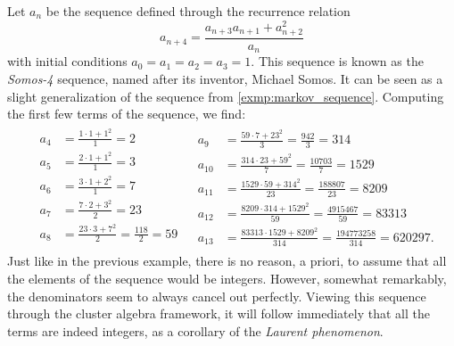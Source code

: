 \begin{example}\label{exmp:somos4}

	Let $a_n$ be the sequence defined through the recurrence relation
	\begin{equation}
		\label{eq:somos_4}
		a_{n+4} = \frac{a_{n+3}a_{n+1}+ a_{n+2}^2}{a_n}
	\end{equation}
	with initial conditions $a_0 = a_1 = a_2 = a_3 = 1$. This sequence is known as the
	\emph{Somos-4} sequence, named after its inventor, Michael
	Somos. It can be seen as a slight generalization of the sequence from
	\cref{exmp:markov_sequence}. Computing the first few terms of the sequence, we find:
	\begin{align*}
		 & \begin{aligned}
			   a_4 & = \frac{1 \cdot 1 + 1^2}{1} = 2                   \\
			   a_5 & = \frac{2 \cdot 1 + 1^2}{1} = 3                   \\
			   a_6 & = \frac{3 \cdot 1 + 2^2}{1} = 7                   \\
			   a_7 & = \frac{7 \cdot 2 + 3^2}{2} = 23                  \\
			   a_8 & = \frac{23 \cdot 3 + 7^2}{2} = \frac{118}{2} = 59 \\
		   \end{aligned}
		 &
		\begin{aligned}
			a_9    & = \frac{59 \cdot 7 + 23^2}{3} = \frac{942}{3} = 314                       \\
			a_{10} & = \frac{314 \cdot 23 + 59^2}{7} = \frac{10703}{7} = 1529                  \\
			a_{11} & = \frac{1529 \cdot 59 + 314^2}{23} = \frac{188807}{23} = 8209             \\
			a_{12} & = \frac{8209 \cdot 314 + 1529^2}{59} = \frac{4915467}{59} = 83313         \\
			a_{13} & = \frac{83313 \cdot 1529 + 8209^2}{314} = \frac{194773258}{314} = 620297.
		\end{aligned}
	\end{align*}
	Just like in the previous example, there is no reason, a priori, to assume that all the
	elements of the sequence would be integers. However, somewhat remarkably, the
	denominators seem to always cancel out perfectly. Viewing this sequence through the
	cluster algebra framework, it will follow immediately that all the terms are indeed
	integers, as a corollary of the \emph{Laurent phenomenon}.
\end{example}

